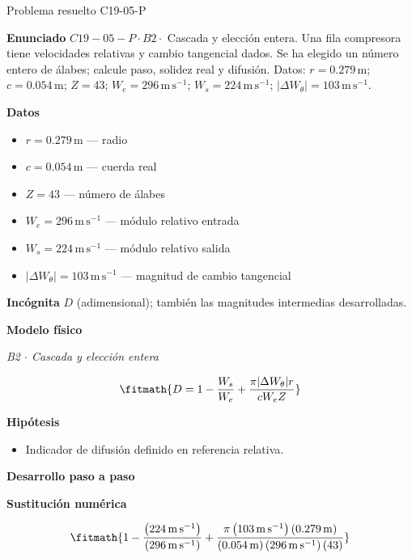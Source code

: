 \documentclass[10pt,openany]{book}
\begin{document}
\begin{studiumworked}{Problema resuelto C19-05-P}


\noindent\textbf{Enunciado}
\(C19-05-P \cdot B2 \cdot\) Cascada y elección entera. Una fila compresora tiene velocidades relativas y cambio tangencial dados. Se ha elegido un número entero de álabes; calcule paso, solidez real y difusión. Datos: \(r=0.279\, \mathrm{m}\); \(c=0.054\, \mathrm{m}\); \(Z=43\); \(W_e=296\, \mathrm{m}\,\mathrm{s}^{-1}\); \(W_s=224\, \mathrm{m}\,\mathrm{s}^{-1}\); \(|\Delta W_\theta|=103\, \mathrm{m}\,\mathrm{s}^{-1}\).

\noindent\textbf{Datos}
\begin{itemize}
\item $r = 0.279\,\mathrm{m}$ — radio
\item $c = 0.054\,\mathrm{m}$ — cuerda real
\item $Z = 43$ — número de álabes
\item $W_e = 296\,\mathrm{m}\,\mathrm{s}^{-1}$ — módulo relativo entrada
\item $W_s = 224\,\mathrm{m}\,\mathrm{s}^{-1}$ — módulo relativo salida
\item $|\Delta W_\theta| = 103\,\mathrm{m}\,\mathrm{s}^{-1}$ — magnitud de cambio tangencial
\end{itemize}

\noindent\textbf{Incógnita}
$D$ (adimensional); también las magnitudes intermedias desarrolladas.

\noindent\textbf{Modelo físico}

\noindent\textit{B2 \(\cdot\) Cascada y elección entera}

\[
\fitmath{D=1 - \frac{W_s}{W_e} + \frac{\pi |\Delta W_\theta| r}{c W_e Z}}
\]

\noindent\textbf{Hipótesis}
\begin{itemize}
\item Indicador de difusión definido en referencia relativa.
\end{itemize}

\noindent\textbf{Desarrollo paso a paso}



\noindent\textbf{Sustitución numérica}

\[
\fitmath{1 - \frac{\left(224\,\mathrm{m}\,\mathrm{s}^{-1}\right)}{\left(296\,\mathrm{m}\,\mathrm{s}^{-1}\right)} + \frac{\pi \left(103\,\mathrm{m}\,\mathrm{s}^{-1}\right) \left(0.279\,\mathrm{m}\right)}{\left(0.054\,\mathrm{m}\right) \left(296\,\mathrm{m}\,\mathrm{s}^{-1}\right) \left(43\right)}}
\]


\end{studiumworked}
\end{document}
